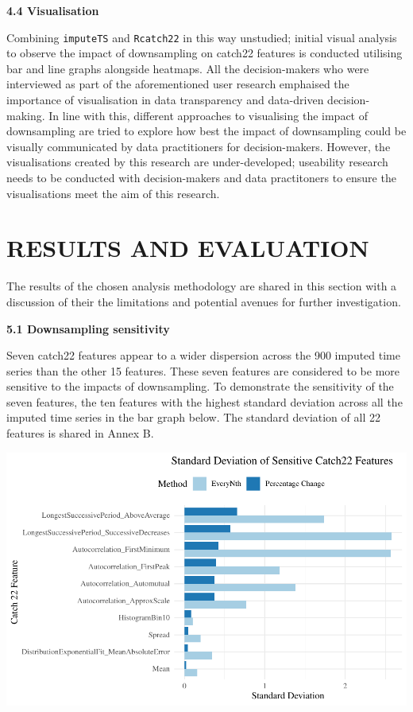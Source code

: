 \documentclass{article}
\begin{document}
\textbf{4.4 Visualisation}

Combining \texttt{imputeTS} and \texttt{Rcatch22} in this way unstudied;
initial visual analysis to observe the impact of downsampling on catch22
features is conducted utilising bar and line graphs alongside heatmaps.
All the decision-makers who were interviewed as part of the
aforementioned user research emphaised the importance of visualisation
in data transparency and data-driven decision-making. In line with this,
different approaches to visualising the impact of downsampling are tried
to explore how best the impact of downsampling could be visually
communicated by data practitioners for decision-makers. However, the
visualisations created by this research are under-developed; useability
research needs to be conducted with decision-makers and data
practitoners to ensure the visualisations meet the aim of this research.

\hypertarget{results-and-evaluation}{%
\section{RESULTS AND EVALUATION}\label{results-and-evaluation}}

The results of the chosen analysis methodology are shared in this
section with a discussion of their the limitations and potential avenues
for further investigation.

\textbf{5.1 Downsampling sensitivity}

Seven catch22 features appear to a wider dispersion across the 900
imputed time series than the other 15 features. These seven features are
considered to be more sensitive to the impacts of downsampling. To
demonstrate the sensitivity of the seven features, the ten features with
the highest standard deviation across all the imputed time series in the
bar graph below. The standard deviation of all 22 features is shared in
Annex B.

\includegraphics{210431461_CSC8639_Dissertation_files/figure-latex/CombinedSensitivity-1.pdf}
\end{document}
